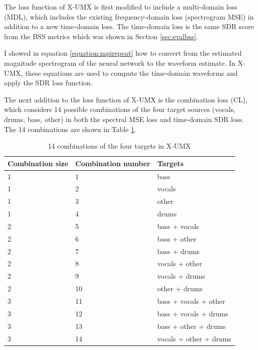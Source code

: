 \documentclass[report.tex]{subfiles}
\begin{document}
The loss function of X-UMX is first modified to include a multi-domain loss (MDL), which includes the existing frequency-domain loss (spectrogram MSE) in addition to a new time-domain loss. The time-domain loss is the same SDR score from the BSS metrics which was shown in Section \ref{sec:evalbss}.

I showed in equation \eqref{equation:mpirepeat} how to convert from the estimated magnitude spectrogram of the neural network to the waveform estimate. In X-UMX, these equations are used to compute the time-domain waveforms and apply the SDR loss function.

The next addition to the loss function of X-UMX is the combination loss (CL), which considers 14 possible combinations of the four target sources (vocals, drums, bass, other) in both the spectral MSE loss and time-domain SDR loss. The 14 combinations are shown in Table \ref{table:14targets}.

\begin{table}[ht]
	\centering
	\caption{14 combinations of the four targets in X-UMX}
	\label{table:14targets}
	\begin{tabular}{ |l|l|l| }
	 \hline
		Combination size & Combination number & Targets \\
	 \hline
	 \hline
	 	1 & 1 & bass \\
	 \hline
	 	1 & 2 & vocals \\
	 \hline
	 	1 & 3 & other \\
	 \hline
	 	1 & 4 & drums \\
	 \hline
	 	2 & 5 & bass + vocals \\
	 \hline
	 	2 & 6 & bass + other \\
	 \hline
	 	2 & 7 & bass + drums \\
	 \hline
	 	2 & 8 & vocals + other \\
	 \hline
	 	2 & 9 & vocals + drums \\
	 \hline
	 	2 & 10 & other + drums \\
	 \hline
	 	3 & 11 & bass + vocals + other \\
	 \hline
	 	3 & 12 & bass + vocals + drums \\
	 \hline
	 	3 & 13 & bass + other + drums \\
	 \hline
	 	3 & 14 & vocals + other + drums \\
	 \hline
\end{tabular}
\end{table}
\end{document}
